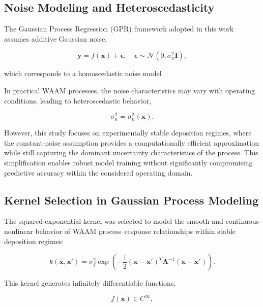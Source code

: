 \documentclass[11pt]{article}
\begin{document}
\subsection{Noise Modeling and Heteroscedasticity}\label{Noise Modelling}


The Gaussian Process Regression (GPR) framework adopted in this work assumes additive Gaussian noise,

\begin{equation}
\mathbf{y} =
f(\mathbf{x}) + \boldsymbol{\epsilon},
\quad
\boldsymbol{\epsilon} \sim \mathcal{N}(0,\sigma_n^2 \mathbf{I}),
\end{equation}

which corresponds to a homoscedastic noise model \cite{Rasmussen2006}. 

In practical WAAM processes, the noise characteristics may vary with operating conditions, leading to heteroscedastic behavior,

\begin{equation}
\sigma_n^2 = \sigma_n^2(\mathbf{x}).
\end{equation}

However, this study focuses on experimentally stable deposition regimes, where the constant-noise assumption provides a computationally efficient approximation while still capturing the dominant uncertainty characteristics of the process. This simplification enables robust model training without significantly compromising predictive accuracy within the considered operating domain.

\subsection{Kernel Selection in Gaussian Process Modeling}

The squared-exponential kernel was selected to model the smooth and continuous nonlinear behavior of WAAM process--response relationships within stable deposition regimes:

\begin{equation}
k(\mathbf{x},\mathbf{x}') =
\sigma_f^2
\exp\!\left(
-\frac{1}{2}
(\mathbf{x}-\mathbf{x}')^{T}
\mathbf{\Lambda}^{-1}
(\mathbf{x}-\mathbf{x}')
\right).
\end{equation}

This kernel generates infinitely differentiable functions,

\begin{equation}
f(\mathbf{x}) \in C^{\infty},
\end{equation}
\end{document}
